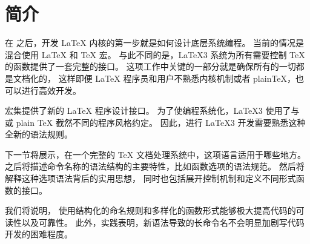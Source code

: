 \documentclass[full]{l3doc}
\begin{document}
\section{简介}

%
在 \LaTeXe{} 之后，开发 \LaTeX{} 内核的第一步就是如何设计底层系统编程。
当前的情况是混合使用 \LaTeX{} 和 \TeX{} 宏。
与此不同的是，\LaTeX3 系统为所有需要控制 \TeX{} 的函数提供了一套完整的接口。
这项工作中关键的一部分就是确保所有的一切都是文档化的，
这样即便 \LaTeX{} 程序员和用户不熟悉内核机制或者 plain\TeX{}，也可以进行高效开发。

%
 宏集提供了新的 \LaTeX{} 程序设计接口。
为了使编程系统化，\LaTeX3 使用了与 \LaTeXe{} 或 plain \TeX{} 截然不同的程序风格约定。
因此，进行 \LaTeX3 开发需要熟悉这种全新的语法规则。

%
下一节将展示，在一个完整的 \TeX{} 文档处理系统中，这项语言适用于哪些地方。
之后将描述命令名称的语法结构的主要特性，比如函数选项的语法规范。
%
然后将解释这种选项语法背后的实用思想，
同时也包括展开控制机制和定义不同形式函数的接口。

我们将说明，
使用结构化的命名规则和多样化的函数形式能够极大提高代码的可读性以及可靠性。
此外，实践表明，新语法导致的长命令名不会明显加剧写代码开发的困难程度。
\end{document}
